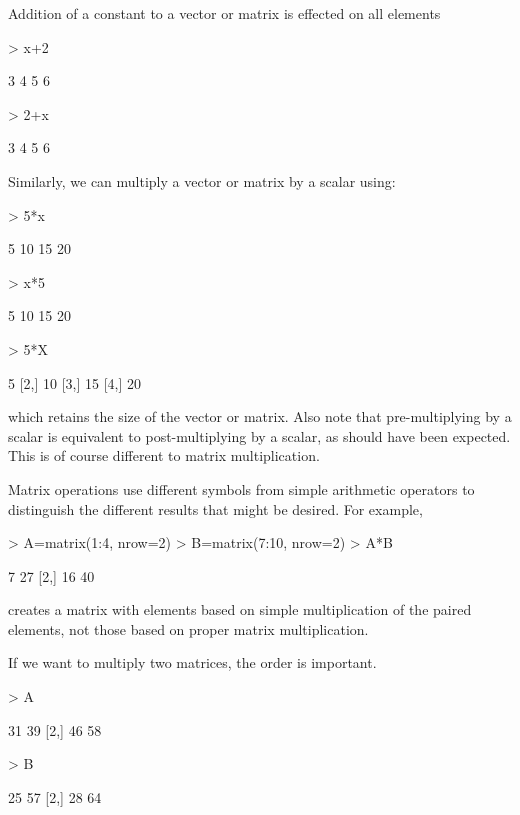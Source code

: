 Addition of a constant to a vector or matrix is effected on all elements
\begin{Schunk}
\begin{Sinput}
> x+2
\end{Sinput}
\begin{Soutput}
[1] 3 4 5 6
\end{Soutput}
\begin{Sinput}
> 2+x
\end{Sinput}
\begin{Soutput}
[1] 3 4 5 6
\end{Soutput}
\end{Schunk}
Similarly, we can multiply a vector or matrix by a scalar using:
\begin{Schunk}
\begin{Sinput}
> 5*x
\end{Sinput}
\begin{Soutput}
[1]  5 10 15 20
\end{Soutput}
\begin{Sinput}
> x*5
\end{Sinput}
\begin{Soutput}
[1]  5 10 15 20
\end{Soutput}
\begin{Sinput}
> 5*X
\end{Sinput}
\begin{Soutput}
     [,1]
[1,]    5
[2,]   10
[3,]   15
[4,]   20
\end{Soutput}
\end{Schunk}
which retains the size of the vector or matrix. Also note that pre-multiplying by a scalar is equivalent to post-multiplying by a scalar, as should have been expected. This is of course different to matrix multiplication.

Matrix operations use different symbols from simple arithmetic operators to distinguish the different results that might be desired. For example,
\begin{Schunk}
\begin{Sinput}
> A=matrix(1:4, nrow=2)
> B=matrix(7:10, nrow=2)
> A*B
\end{Sinput}
\begin{Soutput}
     [,1] [,2]
[1,]    7   27
[2,]   16   40
\end{Soutput}
\end{Schunk}
creates a matrix with elements based on simple multiplication of the paired elements, not those based on proper matrix multiplication.

If we want to multiply two matrices, the order is important.
\begin{Schunk}
\begin{Sinput}
> A%*%B
\end{Sinput}
\begin{Soutput}
     [,1] [,2]
[1,]   31   39
[2,]   46   58
\end{Soutput}
\begin{Sinput}
> B%*%A
\end{Sinput}
\begin{Soutput}
     [,1] [,2]
[1,]   25   57
[2,]   28   64
\end{Soutput}
\end{Schunk}

